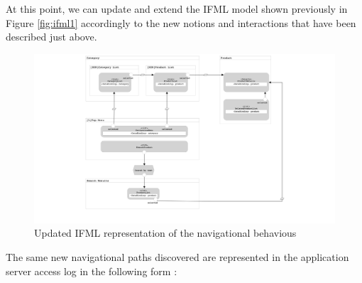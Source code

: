 At this point, we can update and extend the IFML model shown previously in Figure \ref{fig:ifml1} accordingly to the new notions and interactions that have been described just above.

\vspace{0.5cm}
\begin{figure}[H]
  \centering
    \includegraphics[width=16cm]{images/madison/ifml2.png}
  \caption{Updated IFML representation of the navigational behavious}
  \label{fig:ifml2}
\end{figure}
\vspace{0.5cm}

The same new navigational paths discovered are represented in the application server access log in the following form : 

